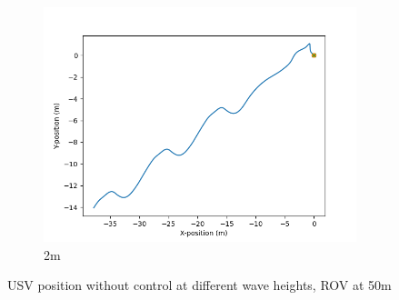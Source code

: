 \documentclass[class=article, crop=false]{standalone}
\begin{document}
\begin{figure}
\begin{subfigure}[b]{0.48\textwidth}
        \includegraphics{scenario1/rov-50m/2.0m/usv_position_uncontrolled}
        \caption{2m}
        \label{}
    \end{subfigure}

    \caption{USV position without control at different wave heights, ROV at 50m}
\end{figure}
\end{document}
